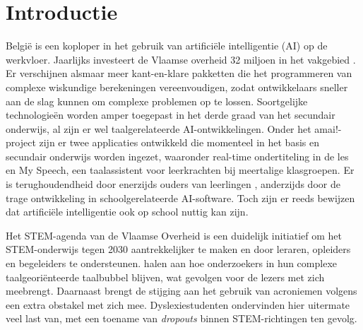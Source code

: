 





\section{Introductie}%
\label{sec:introductie}

België is een koploper in het gebruik van artificiële intelligentie (AI) op de werkvloer. Jaarlijks investeert de Vlaamse overheid 32 miljoen in het vakgebied \autocite{Crevits2022}. Er verschijnen alsmaar meer kant-en-klare pakketten die het programmeren van complexe wiskundige berekeningen vereenvoudigen, zodat ontwikkelaars sneller aan de slag kunnen om complexe problemen op te lossen.  Soortgelijke technologieën worden amper toegepast in het derde graad van het secundair onderwijs, al zijn er wel taalgerelateerde AI-ontwikkelingen. Onder het amai!-project  zijn er twee applicaties ontwikkeld die momenteel in het basis en secundair onderwijs worden ingezet, waaronder real-time ondertiteling in de les en My Speech, een taalassistent voor leerkrachten bij meertalige klasgroepen.  Er is terughoudendheid door enerzijds ouders van leerlingen \autocite{Martens2021}, anderzijds door de trage ontwikkeling in schoolgerelateerde AI-software. Toch zijn er reeds bewijzen dat artificiële intelligentie ook op school nuttig kan zijn. 

Het STEM-agenda van de Vlaamse Overheid is een duidelijk initiatief om het STEM-onderwijs tegen 2030 aantrekkelijker te maken en door leraren, opleiders en begeleiders te ondersteunen. \textcite{PlavenSigray2017} halen aan hoe onderzoekers in hun complexe taalgeoriënteerde taalbubbel blijven, wat gevolgen voor de lezers met zich meebrengt. Daarnaast brengt de stijging aan het gebruik van acroniemen volgens \textcite{Barnett2020} een extra obstakel met zich mee. Dyslexiestudenten ondervinden hier uitermate veel last van, met een toename van \textit{dropouts} binnen STEM-richtingen ten gevolg. %

